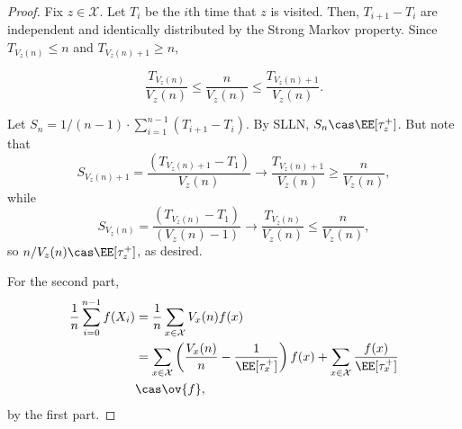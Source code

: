 \begin{proof}
	Fix $z\in \mathcal{X}$. Let $T_i$ be the $i$th time that $z$ is visited. Then, $T_{i+1}-T_i$ are independent and identically distributed by the Strong Markov property. Since $T_{V_z(n)}\leq n$ and $T_{V_z(n)+1}\geq n$, 

\[\frac{T_{V_z(n)}}{V_z(n)}\leq \frac{n}{V_z(n)} \leq \frac{T_{V_z(n)+1}}{V_z(n)}.\]

Let $S_n = 1/(n-1) \cdot \sum_{i=1}^{n-1}(T_{i+1} - T_i)$. By SLLN, $S_n\cas \EE[\tau_z^+]$. But note that 
\[S_{V_z(n)+1} = \frac{(T_{V_z(n) + 1}-T_1)}{V_z(n)} \rightarrow \frac{T_{V_z(n) + 1}}{V_z(n)} \geq \frac{n}{V_z(n)},\] 
while 
\[S_{V_z(n)} = \frac{(T_{V_z(n)} - T_1)}{(V_z(n) - 1)}\rightarrow \frac{T_{V_z(n)}}{V_z(n)} \leq \frac{n}{V_z(n)},\] 
so $n / V_z(n)\cas \EE[\tau_z^+]$, as desired.

For the second part,
\begin{align*}
	\frac{1}{n}\sum_{i=0}^{n-1}f(X_i) &= \frac{1}{n}\sum_{x\in \mathcal{X}}V_x(n)f(x) \\
																		&= \sum_{x\in \mathcal{X}}\left(\frac{V_x(n)}{n} - \frac{1}{\EE[\tau_x^+]}\right)f(x)  + \sum_{x\in \mathcal{X}} \frac{f(x)}{\EE[\tau_x^+]} \\
																		&\cas \ov{f},
\end{align*}
by the first part. 
\end{proof}



